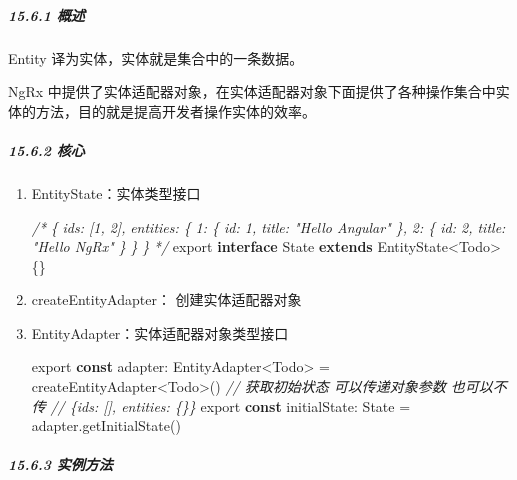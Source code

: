 \documentclass[
]{article}
\newenvironment{Shaded}{}{}
\newcommand{\CommentTok}[1]{\textcolor[rgb]{0.38,0.63,0.69}{\textit{#1}}}
\newcommand{\FunctionTok}[1]{\textcolor[rgb]{0.02,0.16,0.49}{#1}}
\newcommand{\ImportTok}[1]{#1}
\newcommand{\KeywordTok}[1]{\textcolor[rgb]{0.00,0.44,0.13}{\textbf{#1}}}
\newcommand{\NormalTok}[1]{#1}
\newcommand{\OperatorTok}[1]{\textcolor[rgb]{0.40,0.40,0.40}{#1}}
\begin{document}
\hypertarget{1561-ux6982ux8ff0}{%
\subparagraph{15.6.1 概述}\label{1561-ux6982ux8ff0}}

Entity 译为实体，实体就是集合中的一条数据。

NgRx
中提供了实体适配器对象，在实体适配器对象下面提供了各种操作集合中实体的方法，目的就是提高开发者操作实体的效率。

\hypertarget{1562-ux6838ux5fc3}{%
\subparagraph{15.6.2 核心}\label{1562-ux6838ux5fc3}}

\begin{enumerate}
\def\labelenumi{\arabic{enumi}.}
\item
  EntityState：实体类型接口

\begin{Shaded}
\begin{Highlighting}[]
\CommentTok{/*}
\CommentTok{	\{}
\CommentTok{		ids: [1, 2],}
\CommentTok{		entities: \{}
\CommentTok{			1: \{ id: 1, title: "Hello Angular" \},}
\CommentTok{			2: \{ id: 2, title: "Hello NgRx" \}}
\CommentTok{		\}}
\CommentTok{	\}}
\CommentTok{*/}
\ImportTok{export} \KeywordTok{interface}\NormalTok{ State }\KeywordTok{extends}\NormalTok{ EntityState}\OperatorTok{\textless{}}\NormalTok{Todo}\OperatorTok{\textgreater{}}\NormalTok{ \{\}}
\end{Highlighting}
\end{Shaded}
\item
  createEntityAdapter： 创建实体适配器对象
\item
  EntityAdapter：实体适配器对象类型接口

\begin{Shaded}
\begin{Highlighting}[]
\ImportTok{export} \KeywordTok{const}\NormalTok{ adapter}\OperatorTok{:}\NormalTok{ EntityAdapter}\OperatorTok{\textless{}}\NormalTok{Todo}\OperatorTok{\textgreater{}} \OperatorTok{=}\NormalTok{ createEntityAdapter}\OperatorTok{\textless{}}\NormalTok{Todo}\OperatorTok{\textgreater{}}\NormalTok{()}
\CommentTok{// 获取初始状态 可以传递对象参数 也可以不传}
\CommentTok{// \{ids: [], entities: \{\}\}}
\ImportTok{export} \KeywordTok{const}\NormalTok{ initialState}\OperatorTok{:}\NormalTok{ State }\OperatorTok{=}\NormalTok{ adapter}\OperatorTok{.}\FunctionTok{getInitialState}\NormalTok{()}
\end{Highlighting}
\end{Shaded}
\end{enumerate}

\hypertarget{1563-ux5b9eux4f8bux65b9ux6cd5}{%
\subparagraph{15.6.3 实例方法}\label{1563-ux5b9eux4f8bux65b9ux6cd5}}
\end{document}
